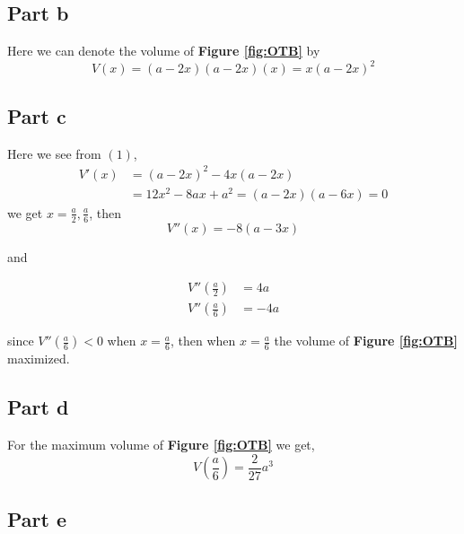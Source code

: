 \documentclass{article}
\begin{document}
\subsection*{Part b}
Here we can denote the volume of \textbf{Figure \ref{fig:OTB}} by
\begin{equation}
    V(x) = (a-2x)(a-2x)(x) = x(a-2x)^2
\end{equation}

\subsection*{Part c}
Here we see from $(1)$,
\begin{align*}
    V'(x) &= (a-2x)^2 - 4x(a-2x) \\
    &= 12x^2 - 8ax + a^2 = (a-2x)(a-6x) = 0
\end{align*}
we get $x = \frac{a}{2}, \frac{a}{6}$, then
\begin{equation*}
    V''(x) = -8(a-3x)
\end{equation*}

and

\begin{align*}
    V''\left(\frac{a}{2}\right) &= 4a \\
    V''\left(\frac{a}{6}\right) &= -4a
\end{align*}

since $V''\left(\frac{a}{6}\right) < 0$ when $x = \frac{a}{6}$, then when $x = \frac{a}{6}$ the volume of \textbf{Figure \ref{fig:OTB}} maximized.

\subsection*{Part d}
For the maximum volume of \textbf{Figure \ref{fig:OTB}} we get,
\begin{equation*}
    V\left(\frac{a}{6}\right) = \frac{2}{27}a^3
\end{equation*}

\subsection*{Part e}
\end{document}
